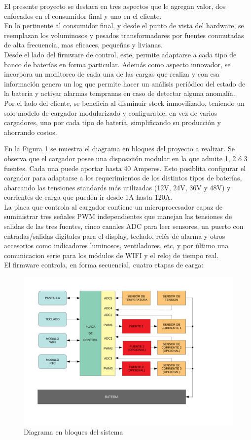 \documentclass[11pt]{charter}
\begin{document}
El presente proyecto se destaca en tres aspectos que le agregan valor, dos enfocados en el consumidor final y uno en el cliente.
\\[3pt]
En lo pertinente al consumidor final, y desde el punto de vista del hardware, se reemplazan los voluminosos y pesados transformadores por fuentes conmutadas de alta frecuencia, mas eficaces, pequeñas y livianas.\\
Desde el lado del firmware de control, este, permite adaptarse a cada tipo de banco de baterías en forma particular. Además como aspecto innovador, se incorpora un monitoreo de cada una de las cargas que realiza y con esa información genera un log que permite hacer un análisis periódico del estado de la batería y activar alarmas tempranas en caso de detectar alguna anomalía.
\\[3pt]
Por el lado del cliente, se beneficia al disminuir stock inmovilizado, teniendo un solo modelo de cargador modularizado y configurable, en vez de varios cargadores, uno por cada tipo de batería, simplificando su producción y ahorrando costos.

En la Figura \ref{fig:diagBloques} se muestra el diagrama en bloques del proyecto a realizar. Se observa que el cargador posee una disposición modular en la que admite 1, 2 ó 3 fuentes. Cada una puede aportar hasta 40 Amperes. Esto posiblita configurar el cargador para adaptarse a los requerimientos de los distintos tipos de baterías, abarcando las tensiones standards más utilizadas (12V, 24V, 36V y 48V) y corrientes de carga que pueden ir desde 1A hasta 120A.\\[3pt]
La placa que controla al cargador contiene un microprocesador capaz de suministrar tres señales PWM independientes  que manejan las tensiones de salidas de las tres fuentes, cinco canales ADC para leer sensores, un puerto con entradas/salidas digitales para el display, teclado, relés de alarma y otros accesorios como indicadores luminosos, ventiladores, etc, y por último una comunicacion serie para los módulos de WIFI y el reloj de tiempo real.\\[3pt]
El firmware controla, en forma secuencial, cuatro etapas de carga:


\begin{figure}[htpb]
\centering 
\includegraphics[width=.8\textwidth]{./Figuras/Plan_Figura1.pdf}
\caption{Diagrama en bloques del sistema}
\label{fig:diagBloques}
\end{figure}
\end{document}
